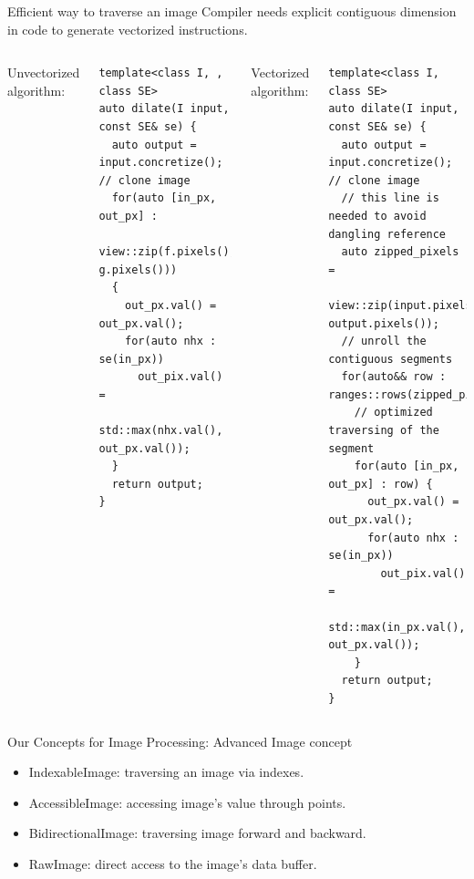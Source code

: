 \documentclass[12pt,aspectratio=169]{beamer}
\begin{document}
\begin{frame}[fragile]{Efficient way to traverse an image}
  Compiler needs explicit contiguous dimension in code to generate vectorized instructions.
  \begin{columns}[T,onlytextwidth]
    Unvectorized algorithm:
    \begin{verbatim}
template<class I, , class SE>
auto dilate(I input, const SE& se) {
  auto output = input.concretize(); // clone image
  for(auto [in_px, out_px] :
        view::zip(f.pixels(), g.pixels()))
  {
    out_px.val() = out_px.val();
    for(auto nhx : se(in_px))
      out_pix.val() =
        std::max(nhx.val(), out_px.val());
  }
  return output;
}
    \end{verbatim}
    Vectorized algorithm:
    \begin{verbatim}
template<class I, class SE>
auto dilate(I input, const SE& se) {
  auto output = input.concretize(); // clone image
  // this line is needed to avoid dangling reference
  auto zipped_pixels =
        view::zip(input.pixels(), output.pixels());
  // unroll the contiguous segments
  for(auto&& row : ranges::rows(zipped_pixels))
    // optimized traversing of the segment
    for(auto [in_px, out_px] : row) {
      out_px.val() = out_px.val();
      for(auto nhx : se(in_px))
        out_pix.val() =
          std::max(in_px.val(), out_px.val());
    }
  return output;
}
    \end{verbatim}
  \end{columns}
\end{frame}

\begin{frame}[fragile]{Our Concepts for Image Processing: Advanced Image concept}
  \begin{itemize}
    \item IndexableImage: traversing an image via indexes.
    \item AccessibleImage: accessing image's value through points.
    \item BidirectionalImage: traversing image forward and backward.
    \item RawImage: direct access to the image's data buffer.
  \end{itemize}
\end{frame}
\end{document}
